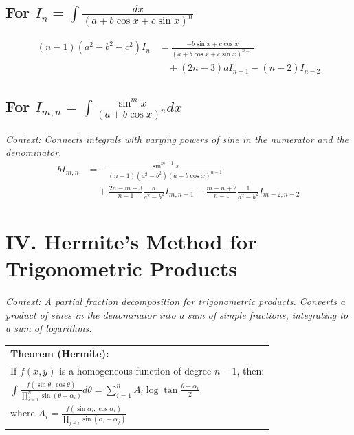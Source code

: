 \documentclass[11pt, a4paper]{article}
\begin{document}
\subsection*{\color{secondary} For $I_n = \int \frac{dx}{(a+b\cos x+c\sin x)^n}$}
\begin{align*}
    (n-1)(a^2-b^2-c^2) I_n &= \frac{-b\sin x+c\cos x}{(a+b\cos x+c\sin x)^{n-1}} \\
    &\quad + (2n-3)a I_{n-1} - (n-2) I_{n-2}
\end{align*}

\subsection*{\color{secondary} For $I_{m,n} = \int \frac{\sin^m x}{(a+b\cos x)^n} dx$}
\textit{\small Context: Connects integrals with varying powers of sine in the numerator and the denominator.}
\begin{align*}
    b I_{m,n} &= -\frac{\sin^{m+1} x}{(n-1)(a^2-b^2)(a+b\cos x)^{n-1}} \\
    &\quad + \frac{2n-m-3}{n-1} \frac{a}{a^2-b^2} I_{m,n-1} - \frac{m-n+2}{n-1} \frac{1}{a^2-b^2} I_{m-2,n-2}
\end{align*}

\section*{\color{primary} IV. Hermite's Method for Trigonometric Products}

\textit{\small Context: A partial fraction decomposition for trigonometric products. Converts a product of sines in the denominator into a sum of simple fractions, integrating to a sum of logarithms.}

\begin{center}
\begin{tabular}{@{}p{}@{}}
\toprule
\textbf{\color{accent}Theorem (Hermite):} \\
If $f(x,y)$ is a homogeneous function of degree $n-1$, then: \\
$\int \frac{f(\sin\theta, \cos\theta)}{\prod_{i=1}^n \sin(\theta-\alpha_i)} d\theta = \sum_{i=1}^n A_i \log \tan \frac{\theta-\alpha_i}{2}$ \\
where $A_i = \frac{f(\sin\alpha_i, \cos\alpha_i)}{\prod_{j \neq i} \sin(\alpha_i-\alpha_j)}$ \\
\bottomrule
\end{tabular}
\end{center}
\end{document}
